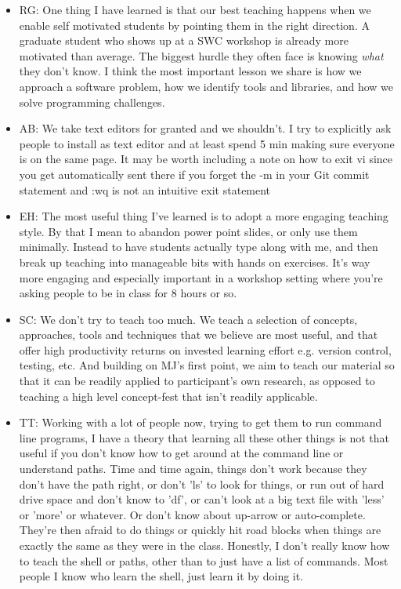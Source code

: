 \documentclass{article}
\begin{document}
\begin{itemize}
  \item RG: One thing I have learned is that our best teaching happens
    when we enable self motivated students by pointing them in the
    right direction. A graduate student who shows up at a SWC workshop
    is already more motivated than average. The biggest hurdle they
    often face is knowing \emph{what} they don't know. I think the
    most important lesson we share is how we approach a software
    problem, how we identify tools and libraries, and how we solve
    programming challenges.

  \item AB: We take text editors for granted and we shouldn't. I try
    to explicitly ask people to install as text editor and at least
    spend 5 min making sure everyone is on the same page. It may be
    worth including a note on how to exit vi since you get
    automatically sent there if you forget the -m in your Git commit
    statement and :wq is not an intuitive exit statement

  \item EH: The most useful thing I've learned is to adopt a more
    engaging teaching style.  By that I mean to abandon power point
    slides, or only use them minimally.  Instead to have students
    actually type along with me, and then break up teaching into
    manageable bits with hands on exercises.  It's way more engaging
    and especially important in a workshop setting where you're asking
    people to be in class for 8 hours or so.

  \item SC: We don't try to teach too much. We teach a selection of
    concepts, approaches, tools and techniques that we believe are
    most useful, and that offer high productivity returns on invested
    learning effort e.g. version control, testing, etc.  And building
    on MJ's first point, we aim to teach our material so that it can
    be readily applied to participant's own research, as opposed to
    teaching a high level concept-fest that isn't readily applicable.

  \item TT: Working with a lot of people now, trying to get them to
    run command line programs, I have a theory that learning all these
    other things is not that useful if you don't know how to get
    around at the command line or understand paths. Time and time
    again, things don't work because they don't have the path right,
    or don't 'ls' to look for things, or run out of hard drive space
    and don't know to 'df', or can't look at a big text file with
    'less' or 'more' or whatever.  Or don't know about up-arrow or
    auto-complete.  They're then afraid to do things or quickly hit
    road blocks when things are exactly the same as they were in the
    class.  Honestly, I don't really know how to teach the shell or
    paths, other than to just have a list of commands.  Most people I
    know who learn the shell, just learn it by doing it.

\end{itemize}
\end{document}
